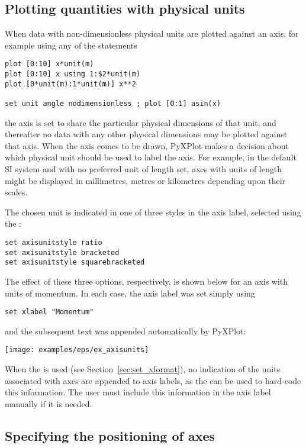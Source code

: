 \subsection{Plotting quantities with physical units}
\label{sec:set_axisunitstyle}

When data with non-dimensionless physical units are plotted against an axis,
for example using any of the statements
\begin{verbatim}
plot [0:10] x*unit(m)
plot [0:10] x using 1:$2*unit(m)
plot [0*unit(m):1*unit(m)] x**2

set unit angle nodimensionless ; plot [0:1] asin(x)
\end{verbatim}
the axis is set to share the particular physical dimensions of that unit, and
thereafter no data with any other physical dimensions may be plotted against
that axis. When the axis comes to be drawn, PyXPlot makes a decision about
which physical unit should be used to label the axis. For example, in the
default SI system and with no preferred unit of length set, axes with units of
length might be displayed in millimetres, metres or kilometres depending upon
their scales.

The chosen unit is indicated in one of three styles in the axis label, selected
using the :
\begin{verbatim}
set axisunitstyle ratio
set axisunitstyle bracketed
set axisunitstyle squarebracketed
\end{verbatim}
The effect of these three options, respectively, is shown below for an axis
with units of momentum. In each case, the axis label was set simply using
\begin{verbatim}
set xlabel "Momentum"
\end{verbatim}
and the subsequent text was appended automatically by PyXPlot:

\vspace{3mm}
\centerline{\texttt{[image: examples/eps/ex\_axisunits]}}
\vspace{3mm}

When the  is used (see Section~\ref{sec:set_xformat}), no
indication of the units associated with axes are appended to axis labels, as
the  can be used to hard-code this information. The user
must include this information in the axis label manually if it is needed.

\subsection{Specifying the positioning of axes}

